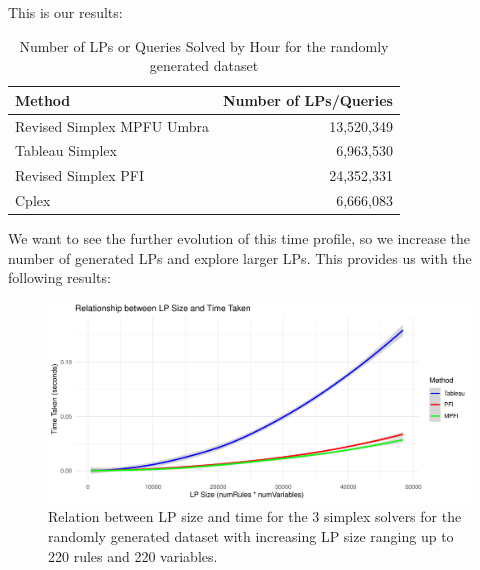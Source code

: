 This is our results:
\begin{table}[!htb]
    \centering
    \caption{Number of LPs or Queries Solved by Hour for the randomly generated dataset}
    \begin{tabular}{l|r}
        \toprule
        Method                     & Number of LPs/Queries \\
        \midrule
        Revised Simplex MPFU Umbra & 13,520,349           \\
        Tableau Simplex            & 6,963,530            \\
        Revised Simplex PFI        &  24,352,331          \\
        Cplex                      & 6,666,083             \\
        \bottomrule
    \end{tabular}
\end{table}

We want to see the further evolution of this time profile, so we increase the number of generated LPs 
and explore larger LPs. This provides us with the following results:

\begin{figure}[!htb]
    \centering
    \includegraphics[width=\linewidth]{figures/size_time_random_large.pdf}
    \caption{Relation between LP size and time for the 3 simplex solvers for the randomly generated
    dataset with increasing LP size ranging up to 220 rules and 220 variables.}
    \label{fig:size_time_random_large}
\end{figure}

